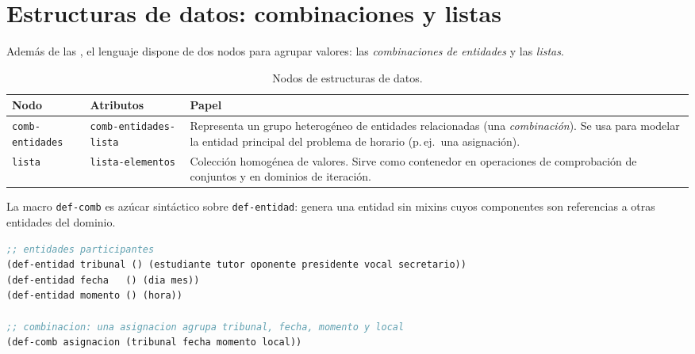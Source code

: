 \documentclass[12pt,a4paper]{report}
\begin{document}

\section{Estructuras de datos: combinaciones y listas}
\label{sec:estructuras}

Además de las , el lenguaje dispone de dos nodos para
agrupar valores: las \emph{combinaciones de entidades} y las \emph{listas}.


\begin{table}[h!]
\centering
\caption{Nodos de estructuras de datos.}
\label{tab:estructuras}
\renewcommand{\arraystretch}{1.3}
\begin{tabular}{p{4.8cm} p{4.5cm} p{5.5cm}}
\hline
\textbf{Nodo} & \textbf{Atributos} & \textbf{Papel} \\
\hline
\texttt{comb-entidades}
  & \texttt{comb-entidades-lista}
  & Representa un grupo heterogéneo de entidades relacionadas
    (una \emph{combinación}). Se usa para modelar la entidad
    principal del problema de horario (p.\,ej.\ una asignación). \\
\hline
\texttt{lista}
  & \texttt{lista-elementos}
  & Colección homogénea de valores. Sirve como contenedor
    en operaciones de comprobación de conjuntos y en dominios
    de iteración. \\
\hline
\end{tabular}
\end{table}

\medskip
\noindent
La macro \texttt{def-comb} es azúcar sintáctico sobre \texttt{def-entidad}:
genera una entidad sin mixins cuyos componentes son referencias a otras
entidades del dominio.

\begin{lstlisting}[language=CommonLisp, caption={Definicion de la combinacion central del problema.}]
;; entidades participantes
(def-entidad tribunal () (estudiante tutor oponente presidente vocal secretario))
(def-entidad fecha   () (dia mes))
(def-entidad momento () (hora))

;; combinacion: una asignacion agrupa tribunal, fecha, momento y local
(def-comb asignacion (tribunal fecha momento local))
\end{lstlisting}
\end{document}
